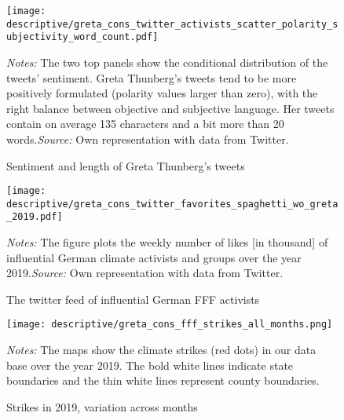 \vspace*{\fill}\clearpage
\vspace*{\fill}
\begin{figure}[H]
	\centering
	\texttt{[image: descriptive/greta\_cons\_twitter\_activists\_scatter\_polarity\_subjectivity\_word\_count.pdf]}
	\begin{minipage}{0.99\linewidth}
		\caption{Sentiment and length of Greta Thunberg's tweets}
		\label{fig_greta_cons:twitter_greta_sentiment_length}
		\scriptsize{\emph{Notes:} The two top panels show the conditional distribution of the tweets' sentiment. Greta Thunberg's tweets tend to be more positively formulated (polarity values larger than zero), with the right balance between objective and subjective language. Her tweets contain on average 135 characters and a bit more than 20 words.\newline\emph{Source:} Own representation with data from Twitter.}
	\end{minipage}
\end{figure}
\vspace*{\fill}\clearpage
\vspace*{\fill}
\begin{figure}[H]
	\centering
	\texttt{[image: descriptive/greta\_cons\_twitter\_favorites\_spaghetti\_wo\_greta\_2019.pdf]}
	\begin{minipage}{0.99\linewidth}
		\caption{The twitter feed of influential German FFF activists}\label{fig_greta_cons:twitter_favorites_activists}
		\scriptsize{\emph{Notes:} The figure plots the weekly number of likes [in thousand] of influential German climate activists and groups over the year 2019.\newline\emph{Source:} Own representation with data from Twitter.}
	\end{minipage}
\end{figure}
\vspace*{\fill}\clearpage
\vspace*{\fill}
\begin{figure}[H]\centering
	\texttt{[image: descriptive/greta\_cons\_fff\_strikes\_all\_months.png]}
	\begin{minipage}{0.99\linewidth}
		\caption{Strikes in 2019, variation across months}\label{fig_greta_cons:fff_strikes_months}
		\scriptsize{\emph{Notes:} The maps show the climate strikes (red dots) in our data base over the year 2019. The bold white lines indicate state boundaries and the thin white lines represent county boundaries.}
	\end{minipage}
\end{figure}
